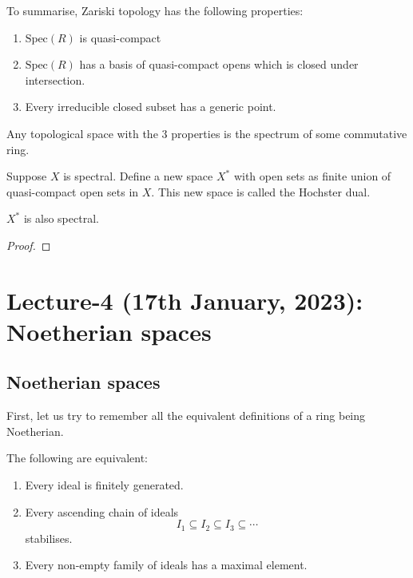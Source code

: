 \documentclass[oneside, 12pt]{scrbook}
\newcommand{\spec}{\mathrm{Spec}}
\theoremstyle{theorem}
\begin{document}
To summarise, Zariski topology has the following properties: 
\begin{enumerate}
\item $\spec(R)$ is quasi-compact
\item $\spec(R)$ has a basis of quasi-compact opens which is closed under intersection.
\item Every irreducible closed subset has a generic point.
\end{enumerate}

\begin{theorem}[Hochster]
Any topological space with the $3$ properties is the spectrum of some commutative ring.
\end{theorem}



Suppose $X$ is spectral. Define a new space $X^{*}$ with open sets as finite union of quasi-compact open sets in $X$. This new space is called the Hochster dual.

\begin{theorem}
$X^{*}$ is also spectral.
\end{theorem} 

\begin{proof}

\end{proof}


\chapter{Lecture-4 (17th January, 2023): Noetherian spaces}

\section{Noetherian spaces}

First, let us try to remember all the equivalent definitions of a ring being Noetherian. 

\begin{proposition}
The following are equivalent:
\begin{enumerate}
\item Every ideal is finitely generated. 
\item Every ascending chain of ideals $$I_{1} \subseteq I_{2} \subseteq I_{3} \subseteq \cdots $$ stabilises. 
\item Every non-empty family of ideals has a maximal element. 
\end{enumerate}
\end{proposition}
\end{document}
